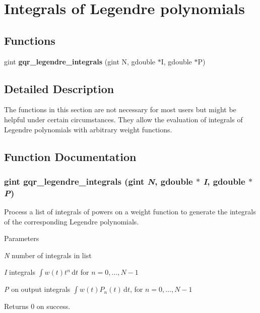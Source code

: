 \section{Integrals of Legendre polynomials}
\label{group__legendre}
\subsection*{Functions}
\begin{DoxyCompactItemize}
\item 
gint {\bf gqr\_\-legendre\_\-integrals} (gint N, gdouble $\ast$I, gdouble $\ast$P)
\end{DoxyCompactItemize}


\subsection{Detailed Description}
The functions in this section are not necessary for most users but might be helpful under certain circumstances. They allow the evaluation of integrals of Legendre polynomials with arbitrary weight functions. 

\subsection{Function Documentation}
\subsubsection[{gqr\_\-legendre\_\-integrals}]{\setlength{\rightskip}{0pt plus 5cm}gint gqr\_\-legendre\_\-integrals (gint {\em N}, \/  gdouble $\ast$ {\em I}, \/  gdouble $\ast$ {\em P})}\label{group__legendre_ga0c8365c9ce4dd95a8779af80c77ff4d6}
Process a list of integrals of powers on a weight function to generate the integrals of the corresponding Legendre polynomials.


\begin{DoxyParams}{Parameters}
\item[{\em N}]number of integrals in list \item[{\em I}]integrals $\int w(t)t^{n}\,\mathrm{d}t$ for $n=0,\ldots,N-1$ \item[{\em P}]on output integrals $\int w(t)P_{n}(t)\,\mathrm{d}t$, for $n=0,\ldots,N-1$\end{DoxyParams}
\begin{DoxyReturn}{Returns}
0 on success. 
\end{DoxyReturn}

